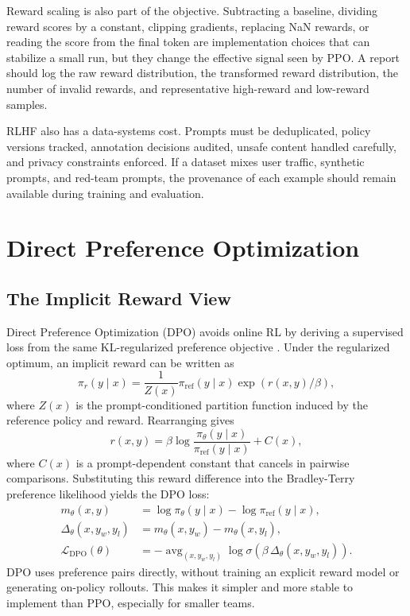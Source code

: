 Reward scaling is also part of the objective. Subtracting a baseline, dividing reward scores by a constant, clipping gradients, replacing NaN rewards, or reading the score from the final token are implementation choices that can stabilize a small run, but they change the effective signal seen by PPO. A report should log the raw reward distribution, the transformed reward distribution, the number of invalid rewards, and representative high-reward and low-reward samples.

RLHF also has a data-systems cost. Prompts must be deduplicated, policy versions tracked, annotation decisions audited, unsafe content handled carefully, and privacy constraints enforced. If a dataset mixes user traffic, synthetic prompts, and red-team prompts, the provenance of each example should remain available during training and evaluation.

\section{Direct Preference Optimization}
\subsection{The Implicit Reward View}
Direct Preference Optimization (DPO) avoids online RL by deriving a supervised loss from the same KL-regularized preference objective \cite{rafailov2023direct}. Under the regularized optimum, an implicit reward can be written as
\[
  \pi_r(y\mid x)
  =
  \frac{1}{Z(x)}
  \pi_{\mathrm{ref}}(y\mid x)
  \exp(r(x,y)/\beta),
\]
where $Z(x)$ is the prompt-conditioned partition function induced by the reference policy and reward. Rearranging gives
\[
    r(x,y)
    =
    \beta \log
    \frac{\pi_\theta(y\mid x)}
         {\pi_{\mathrm{ref}}(y\mid x)}
    + C(x),
\]
where $C(x)$ is a prompt-dependent constant that cancels in pairwise comparisons. Substituting this reward difference into the Bradley-Terry preference likelihood yields the DPO loss:
\[
    \begin{aligned}
    m_\theta(x,y)
      &= \log \pi_\theta(y\mid x)-\log \pi_{\mathrm{ref}}(y\mid x),\\
    \Delta_\theta(x,y_w,y_l)
      &= m_\theta(x,y_w)-m_\theta(x,y_l),\\
    \mathcal{L}_{\mathrm{DPO}}(\theta)
      &= -\operatorname{avg}_{(x,y_w,y_l)}
         \log \sigma(\beta\,\Delta_\theta(x,y_w,y_l)).
    \end{aligned}
\]
DPO uses preference pairs directly, without training an explicit reward model or generating on-policy rollouts. This makes it simpler and more stable to implement than PPO, especially for smaller teams.

